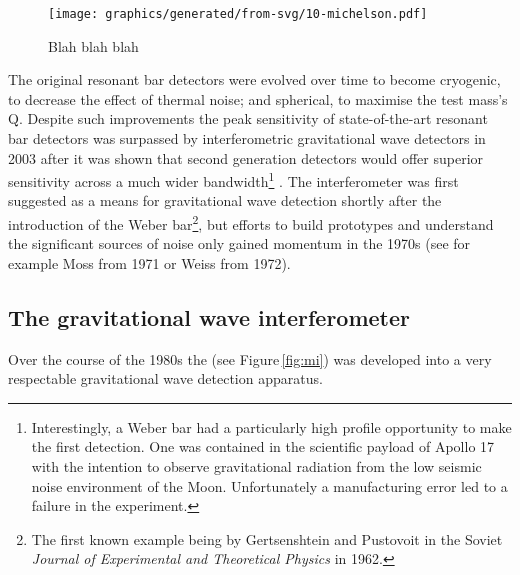\begin{figure}
  \centering
  \texttt{[image: graphics/generated/from-svg/10-michelson.pdf]}
  \caption{Blah blah blah}
\end{figure}

The original resonant bar detectors were evolved over time to become cryogenic, to decrease the effect of thermal noise; and spherical, to maximise the test mass's Q. Despite such improvements the peak sensitivity of state-of-the-art resonant bar detectors was surpassed by interferometric gravitational wave detectors in 2003 \cite{Pitkin2011} after it was shown that second generation detectors would offer superior sensitivity across a much wider bandwidth\footnote{Interestingly, a Weber bar had a particularly high profile opportunity to make the first detection. One was contained in the scientific payload of Apollo 17 with the intention to observe gravitational radiation from the low seismic noise environment of the Moon. Unfortunately a manufacturing error led to a failure in the experiment.} \cite{Harry2002a}. The interferometer was first suggested as a means for gravitational wave detection shortly after the introduction of the Weber bar\footnote{The first known example being by Gertsenshtein and Pustovoit in the Soviet \emph{Journal of Experimental and Theoretical Physics} in 1962.}, but efforts to build prototypes and understand the significant sources of noise only gained momentum in the 1970s (see for example Moss \etal \cite{Moss1971} from 1971 or Weiss \cite{Weiss1972} from 1972).


\subsection{\label{sec:gw-interferometry}The gravitational wave interferometer}

Over the course of the 1980s the \MI{} (see Figure\,\ref{fig:mi}) was developed into a very respectable gravitational wave detection apparatus.

